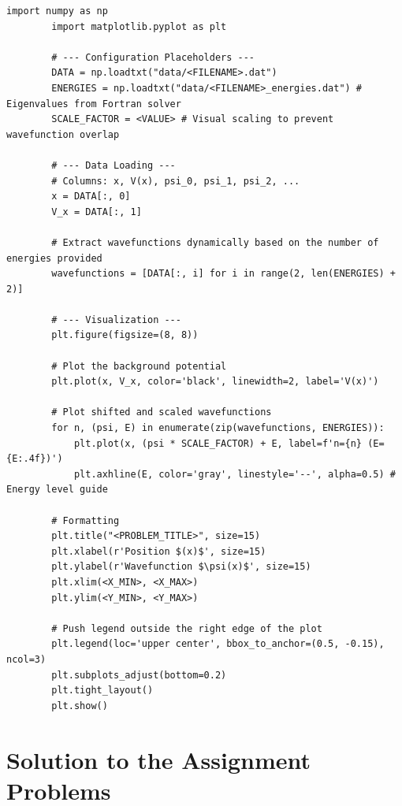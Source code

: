 \documentclass[12pt, a4paper, twoside]{article}
\begin{document}
        \begin{lstlisting}[style=mypython]
        import numpy as np
        import matplotlib.pyplot as plt

        # --- Configuration Placeholders ---
        DATA = np.loadtxt("data/<FILENAME>.dat")
        ENERGIES = np.loadtxt("data/<FILENAME>_energies.dat") # Eigenvalues from Fortran solver
        SCALE_FACTOR = <VALUE> # Visual scaling to prevent wavefunction overlap

        # --- Data Loading ---
        # Columns: x, V(x), psi_0, psi_1, psi_2, ...
        x = DATA[:, 0]
        V_x = DATA[:, 1]

        # Extract wavefunctions dynamically based on the number of energies provided
        wavefunctions = [DATA[:, i] for i in range(2, len(ENERGIES) + 2)]

        # --- Visualization ---
        plt.figure(figsize=(8, 8))

        # Plot the background potential
        plt.plot(x, V_x, color='black', linewidth=2, label='V(x)')

        # Plot shifted and scaled wavefunctions
        for n, (psi, E) in enumerate(zip(wavefunctions, ENERGIES)):
            plt.plot(x, (psi * SCALE_FACTOR) + E, label=f'n={n} (E={E:.4f})')
            plt.axhline(E, color='gray', linestyle='--', alpha=0.5) # Energy level guide

        # Formatting
        plt.title("<PROBLEM_TITLE>", size=15)
        plt.xlabel(r'Position $(x)$', size=15)
        plt.ylabel(r'Wavefunction $\psi(x)$', size=15)
        plt.xlim(<X_MIN>, <X_MAX>)
        plt.ylim(<Y_MIN>, <Y_MAX>)

        # Push legend outside the right edge of the plot
        plt.legend(loc='upper center', bbox_to_anchor=(0.5, -0.15), ncol=3)
        plt.subplots_adjust(bottom=0.2)
        plt.tight_layout()
        plt.show()
        \end{lstlisting}

    
    \section{Solution to the Assignment Problems}
\end{document}
